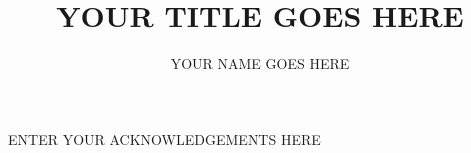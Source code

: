 \documentclass[12pt,PhD]{thesiscls}%
\begin{document}

\title{YOUR TITLE GOES HERE}
\author{YOUR NAME GOES HERE}

\setlength{\footskip}{2cm}

\beforeabstract
{}

\afterabstract
{}

ENTER YOUR ACKNOWLEDGEMENTS HERE

\afterpreface





\pagestyle{fancy}
\lhead{} %
\lfoot{}
\cfoot{\thepage}
\rfoot{}
%
%
%
\end{document}
